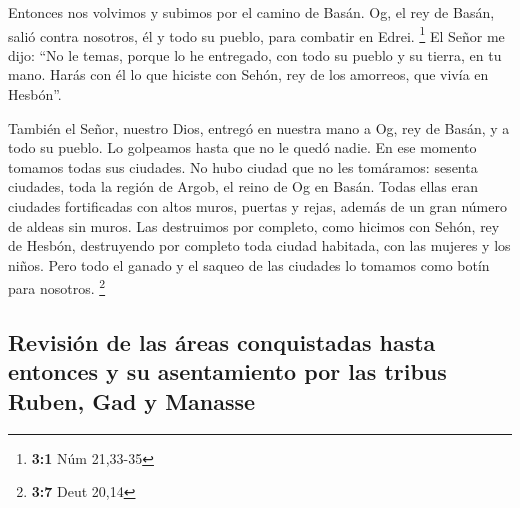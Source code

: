\begin{paracol}{2}
 Entonces nos volvimos y subimos por el camino de Basán.
Og, el rey de Basán, salió contra nosotros, él y todo su pueblo, para
combatir en Edrei. \footnote{\textbf{3:1} Núm 21,33-35} 
El Señor me dijo: ``No le temas, porque lo he entregado, con todo su
pueblo y su tierra, en tu mano. Harás con él lo que hiciste con Sehón,
rey de los amorreos, que vivía en Hesbón''.

 También el Señor, nuestro Dios, entregó en nuestra mano a
Og, rey de Basán, y a todo su pueblo. Lo golpeamos hasta que no le quedó
nadie.  En ese momento tomamos todas sus ciudades. No hubo
ciudad que no les tomáramos: sesenta ciudades, toda la región de Argob,
el reino de Og en Basán.  Todas ellas eran ciudades
fortificadas con altos muros, puertas y rejas, además de un gran número
de aldeas sin muros.  Las destruimos por completo, como
hicimos con Sehón, rey de Hesbón, destruyendo por completo toda ciudad
habitada, con las mujeres y los niños.  Pero todo el
ganado y el saqueo de las ciudades lo tomamos como botín para nosotros.
\footnote{\textbf{3:7} Deut 20,14}

\hypertarget{revisiuxf3n-de-las-uxe1reas-conquistadas-hasta-entonces-y-su-asentamiento-por-las-tribus-ruben-gad-y-manasse}{%
\subsection{Revisión de las áreas conquistadas hasta entonces y su
asentamiento por las tribus Ruben, Gad y
Manasse}\label{revisiuxf3n-de-las-uxe1reas-conquistadas-hasta-entonces-y-su-asentamiento-por-las-tribus-ruben-gad-y-manasse}}


\end{paracol}
